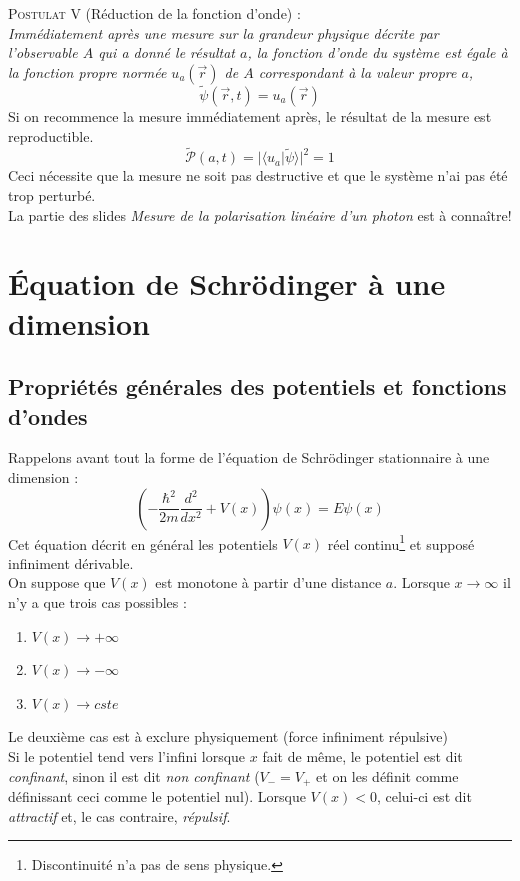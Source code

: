 \documentclass[british,french,11pt, a4paper, openany]{book}
\begin{document}
	\textsc{Postulat V} (Réduction de la fonction d'onde) :\\
	\textit{Immédiatement après une mesure sur la grandeur physique décrite par l'observable $A$ qui a donné le résultat $a$, la fonction d'onde du système est égale à la fonction propre normée $u_a(\vec{r})$ de $A$ correspondant à la valeur propre $a$,}
	\begin{equation}
		\tilde{\psi}(\vec{r},t) = u_a(\vec{r})
	\end{equation}
	Si on recommence la mesure immédiatement après, le résultat de la mesure est reproductible.
	\begin{equation}
		\tilde{\mathcal{P}}(a,t) = |\langle u_a|\tilde{\psi}\rangle |^2 = 1
	\end{equation}
	Ceci nécessite que la mesure ne soit pas destructive et que le système n'ai pas été trop perturbé.\\
	
	La partie des slides \textit{Mesure de la polarisation linéaire d'un photon} est à connaître! 
	
	
	
	
	\chapter{Équation de Schrödinger à une dimension}
	\section{Propriétés générales des potentiels et fonctions d'ondes}
	\label{chap:5.1}
	Rappelons avant tout la forme de l'équation de Schrödinger stationnaire à une dimension : 
	\begin{equation}\label{eq:5.1}
		\left(-\frac{\hbar^2}{2m}\frac{d^2}{dx^2} + V(x)\right)\psi(x) = E\psi(x)
	\end{equation}
	Cet équation décrit en général les potentiels $V(x)$ réel continu\footnote{Discontinuité n'a pas de sens physique.} et supposé infiniment dérivable.\\
	
	On suppose que $V(x)$ est monotone à partir d'une distance $a$. Lorsque $x \rightarrow \infty$ il n'y a que trois cas possibles :
	\begin{enumerate}
		\item $V(x) \rightarrow +\infty$
		\item $V(x) \rightarrow -\infty$
		\item $V(x) \rightarrow cste$
	\end{enumerate}
	Le deuxième cas est à exclure physiquement (force infiniment répulsive)\\
	Si le potentiel tend vers l'infini lorsque $x$ fait de même, le potentiel est dit \textit{confinant}, sinon il est dit \textit{non confinant} ($V_- =V_+$ et on les définit comme définissant ceci comme le potentiel nul). Lorsque $V(x) < 0$, celui-ci est dit \textit{attractif} et, le cas contraire, \textit{répulsif}.\\
	
\end{document}

